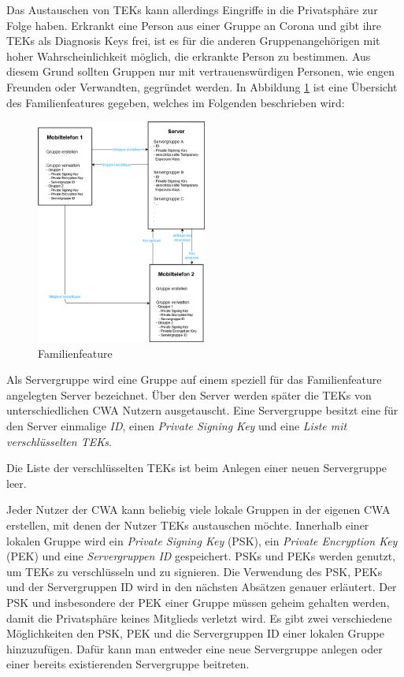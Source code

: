 \documentclass[conference,compsoc]{IEEEtran}
\begin{document}
Das Austauschen von TEKs kann allerdings Eingriffe in die Privatsphäre zur Folge haben.
Erkrankt eine Person aus einer Gruppe an Corona und gibt ihre TEKs als Diagnosis Keys frei, ist es für die anderen Gruppenangehörigen mit hoher Wahrscheinlichkeit möglich, die erkrankte Person zu bestimmen.
Aus diesem Grund sollten Gruppen nur mit vertrauenswürdigen Personen, wie engen Freunden oder Verwandten, gegründet werden.
In Abbildung \ref{Familienfeature_Abbildung} ist eine Übersicht des Familienfeatures gegeben, welches im Folgenden beschrieben wird:

\begin{figure}[h]
	\centering
	\includegraphics[width=0.5\textwidth]{"Familiengruppe"}
	\caption{Familienfeature}
	\label{Familienfeature_Abbildung}
\end{figure}

Als Servergruppe wird eine Gruppe auf einem speziell für das Familienfeature angelegten Server bezeichnet.
Über den Server werden später die TEKs von unterschiedlichen CWA Nutzern ausgetauscht.
Eine Servergruppe besitzt eine für den Server einmalige \textit{ID}, einen \textit{Private Signing Key } und eine \textit{Liste mit verschlüsselten TEKs}.

Die Liste der verschlüsselten TEKs ist beim Anlegen einer neuen Servergruppe leer.

Jeder Nutzer der CWA kann beliebig viele lokale Gruppen in der eigenen CWA erstellen, mit denen der Nutzer TEKs austauschen möchte.
Innerhalb einer lokalen Gruppe wird ein \textit{Private Signing Key} (PSK), ein \textit{Private Encryption Key} (PEK) und eine \textit{Servergruppen ID} gespeichert.
PSKs und PEKs werden genutzt, um TEKs zu verschlüsseln und zu signieren.
Die Verwendung des PSK, PEKs und der Servergruppen ID wird in den nächsten Absätzen genauer erläutert.
Der PSK und insbesondere der PEK einer Gruppe müssen geheim gehalten werden, damit die Privatsphäre keines Mitglieds verletzt wird.
Es gibt zwei verschiedene Möglichkeiten den PSK, PEK und die Servergruppen ID einer lokalen Gruppe hinzuzufügen.
Dafür kann man entweder eine neue Servergruppe anlegen oder einer bereits existierenden Servergruppe beitreten.
\end{document}
